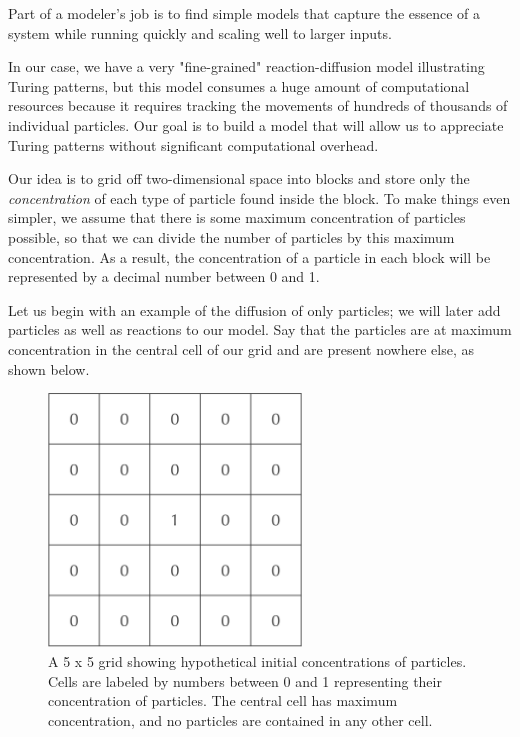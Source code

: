 {Part of a modeler's job is to find simple models that capture the essence of a system while running quickly and scaling well to larger inputs.

In our case, we have a very "fine-grained" reaction-diffusion model illustrating Turing patterns, but this model consumes a huge amount of computational resources because it requires tracking the movements of hundreds of thousands of individual particles. Our goal is to build a model that will allow us to appreciate Turing patterns without significant computational overhead.

Our idea is to grid off two-dimensional space into blocks and store only the \textit{concentration} of each type of particle found inside the block. To make things even simpler, we assume that there is some maximum concentration of particles possible, so that we can divide the number of particles by this maximum concentration. As a result, the concentration of a particle in each block will be represented by a decimal number between 0 and 1.

Let us begin with an example of the diffusion of only  particles; we will later add  particles as well as reactions to our model. Say that the particles are at maximum concentration in the central cell of our grid and are present nowhere else, as shown below.

\begin{figure}[h]
\centering
\mySfFamily
\includegraphics[width = 0.6\textwidth]{../images/initial_A_concentration.png}
\caption{A 5 x 5 grid showing hypothetical initial concentrations of  particles. Cells are labeled by numbers between 0 and 1 representing their concentration of  particles. The central cell has maximum concentration, and no particles are contained in any other cell.}
\label{fig:initial_A_concentration}
\end{figure}

}
